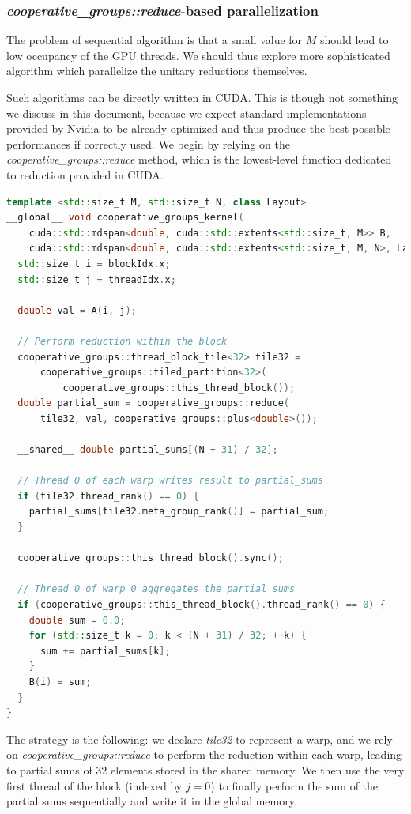 \documentclass{article}
\begin{document}
\subsubsection{\textit{cooperative\_groups::reduce}-based parallelization}

The problem of sequential algorithm is that a small value for $M$ should lead to low occupancy of the GPU threads. We should thus explore more sophisticated algorithm which parallelize the unitary reductions themselves.

Such algorithms can be directly written in CUDA. This is though not something we discuss in this document, because we expect standard implementations provided by Nvidia to be already optimized and thus produce the best possible performances if correctly used. We begin by relying on the \textit{cooperative\_groups::reduce} method, which is the lowest-level function dedicated to reduction provided in CUDA.

\begin{lstlisting}[language=C++]
template <std::size_t M, std::size_t N, class Layout>
__global__ void cooperative_groups_kernel(
    cuda::std::mdspan<double, cuda::std::extents<std::size_t, M>> B,
    cuda::std::mdspan<double, cuda::std::extents<std::size_t, M, N>, Layout> A) {
  std::size_t i = blockIdx.x;
  std::size_t j = threadIdx.x;

  double val = A(i, j);

  // Perform reduction within the block
  cooperative_groups::thread_block_tile<32> tile32 =
      cooperative_groups::tiled_partition<32>(
          cooperative_groups::this_thread_block());
  double partial_sum = cooperative_groups::reduce(
      tile32, val, cooperative_groups::plus<double>());

  __shared__ double partial_sums[(N + 31) / 32];

  // Thread 0 of each warp writes result to partial_sums
  if (tile32.thread_rank() == 0) {
    partial_sums[tile32.meta_group_rank()] = partial_sum;
  }

  cooperative_groups::this_thread_block().sync();

  // Thread 0 of warp 0 aggregates the partial sums
  if (cooperative_groups::this_thread_block().thread_rank() == 0) {
    double sum = 0.0;
    for (std::size_t k = 0; k < (N + 31) / 32; ++k) {
      sum += partial_sums[k];
    }
    B(i) = sum;
  }
}
\end{lstlisting}

The strategy is the following: we declare \textit{tile32} to represent a warp, and we rely on \textit{cooperative\_groups::reduce} to perform the reduction within each warp, leading to partial sums of $32$ elements stored in the shared memory. We then use the very first thread of the block (indexed by $j=0$) to finally perform the sum of the partial sums sequentially and write it in the global memory.
\end{document}
